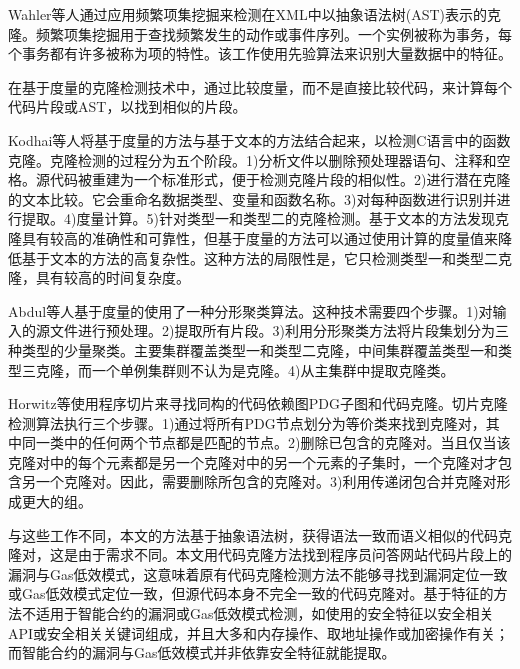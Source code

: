 Wahler等人\cite{clone34}通过应用频繁项集挖掘来检测在XML中以抽象语法树(AST)表示的克隆。频繁项集挖掘用于查找频繁发生的动作或事件序列。一个实例被称为事务，每个事务都有许多被称为项的特性。该工作使用先验算法\cite{clone52}来识别大量数据中的特征。

在基于度量的克隆检测技术中，通过比较度量，而不是直接比较代码，来计算每个代码片段或AST，以找到相似的片段。

Kodhai等人\cite{clone19}将基于度量的方法与基于文本的方法结合起来，以检测C语言中的函数克隆。克隆检测的过程分为五个阶段。1)分析文件以删除预处理器语句、注释和空格。源代码被重建为一个标准形式，便于检测克隆片段的相似性。2)进行潜在克隆的文本比较。它会重命名数据类型、变量和函数名称。3)对每种函数进行识别并进行提取。4)度量计算。5)针对类型一和类型二的克隆检测。基于文本的方法发现克隆具有较高的准确性和可靠性，但基于度量的方法可以通过使用计算的度量值来降低基于文本的方法的高复杂性。这种方法的局限性是，它只检测类型一和类型二克隆，具有较高的时间复杂度。

Abdul等人\cite{clone48}基于度量的使用了一种分形聚类算法。这种技术需要四个步骤。1)对输入的源文件进行预处理。2)提取所有片段。3)利用分形聚类方法将片段集划分为三种类型的少量聚类。主要集群覆盖类型一和类型二克隆，中间集群覆盖类型一和类型三克隆，而一个单例集群则不认为是克隆。4)从主集群中提取克隆类。

Horwitz等\cite{clone22}使用程序切片\cite{clone38}来寻找同构的代码依赖图PDG子图和代码克隆。切片克隆检测算法执行三个步骤。1)通过将所有PDG节点划分为等价类来找到克隆对，其中同一类中的任何两个节点都是匹配的节点。2)删除已包含的克隆对。当且仅当该克隆对中的每个元素都是另一个克隆对中的另一个元素的子集时，一个克隆对才包含另一个克隆对。因此，需要删除所包含的克隆对。3)利用传递闭包合并克隆对形成更大的组。


与这些工作不同，本文的方法基于抽象语法树，获得语法一致而语义相似的代码克隆对，这是由于需求不同。本文用代码克隆方法找到程序员问答网站代码片段上的漏洞与Gas低效模式，这意味着原有代码克隆检测方法不能够寻找到漏洞定位一致或Gas低效模式定位一致，但源代码本身不完全一致的代码克隆对。基于特征的方法不适用于智能合约的漏洞或Gas低效模式检测，如\cite{dicos}使用的安全特征以安全相关API或安全相关关键词组成，并且大多和内存操作、取地址操作或加密操作有关；而智能合约的漏洞与Gas低效模式并非依靠安全特征就能提取。

